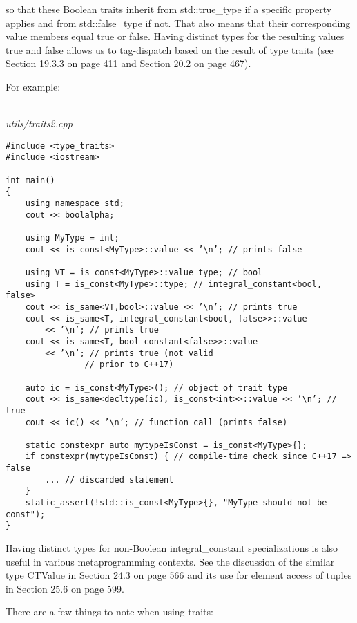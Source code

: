 so that these Boolean traits inherit from std::true\_type if a specific property applies and from std::false\_type if not. That also means that their corresponding value members equal true or false. Having distinct types for the resulting values true and false allows us to tag-dispatch based on the result of type traits (see Section 19.3.3 on page 411 and Section 20.2 on page 467).

For example:

\hspace*{\fill} \\ %
\noindent
\textit{utils/traits2.cpp}
\begin{lstlisting}[style=styleCXX]
#include <type_traits>
#include <iostream>

int main()
{
	using namespace std;
	cout << boolalpha;
	
	using MyType = int;
	cout << is_const<MyType>::value << ’\n’; // prints false
	
	using VT = is_const<MyType>::value_type; // bool
	using T = is_const<MyType>::type; // integral_constant<bool, false>
	cout << is_same<VT,bool>::value << ’\n’; // prints true
	cout << is_same<T, integral_constant<bool, false>>::value
		<< ’\n’; // prints true
	cout << is_same<T, bool_constant<false>>::value
		<< ’\n’; // prints true (not valid	
				// prior to C++17)
				
	auto ic = is_const<MyType>(); // object of trait type
	cout << is_same<decltype(ic), is_const<int>>::value << ’\n’; // true
	cout << ic() << ’\n’; // function call (prints false)
	
	static constexpr auto mytypeIsConst = is_const<MyType>{};
	if constexpr(mytypeIsConst) { // compile-time check since C++17 => false
		... // discarded statement
	}
	static_assert(!std::is_const<MyType>{}, "MyType should not be const");
}
\end{lstlisting}

Having distinct types for non-Boolean integral\_constant specializations is also useful in various metaprogramming contexts. See the discussion of the similar type CTValue in Section 24.3 on page 566 and its use for element access of tuples in Section 25.6 on page 599.


There are a few things to note when using traits:

